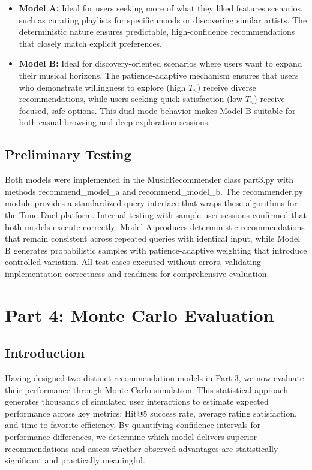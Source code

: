 \documentclass[12pt,a4paper]{article}
\begin{document}
\begin{itemize}
    \item \textbf{Model A:} Ideal for users seeking more of what they liked features scenarios, such as curating playlists for specific moods or discovering similar artists. The deterministic nature ensures predictable, high-confidence recommendations that closely match explicit preferences.
    
    \item \textbf{Model B:} Ideal for discovery-oriented scenarios where users want to expand their musical horizons. The patience-adaptive mechanism ensures that users who demonstrate willingness to explore (high $T_u$) receive diverse recommendations, while users seeking quick satisfaction (low $T_u$) receive focused, safe options. This dual-mode behavior makes Model B suitable for both casual browsing and deep exploration sessions.
\end{itemize}

\subsection{Preliminary Testing}

Both models were implemented in the MusicRecommender class part3.py with methods recommend\_model\_a and recommend\_model\_b. The recommender.py module provides a standardized query interface that wraps these algorithms for the Tune Duel platform. Internal testing with sample user sessions confirmed that both models execute correctly: Model A produces deterministic recommendations that remain consistent across repeated queries with identical input, while Model B generates probabilistic samples with patience-adaptive weighting that introduce controlled variation. All test cases executed without errors, validating implementation correctness and readiness for comprehensive evaluation.

\section{Part 4: Monte Carlo Evaluation}

\subsection{Introduction}
Having designed two distinct recommendation models in Part 3, we now evaluate their performance through Monte Carlo simulation. This statistical approach generates thousands of simulated user interactions to estimate expected performance across key metrics: Hit@5 success rate, average rating satisfaction, and time-to-favorite efficiency. By quantifying confidence intervals for performance differences, we determine which model delivers superior recommendations and assess whether observed advantages are statistically significant and practically meaningful.
\end{document}
